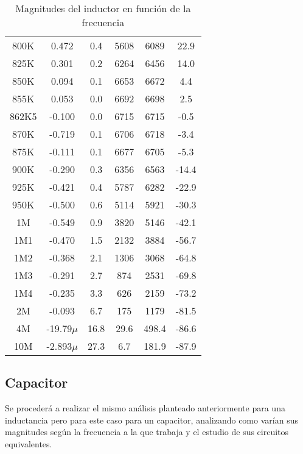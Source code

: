 \begin{center}
\begin{table}[H]
\begin{tabular}{ c c c c c c }
				800K  & 0.472       & 0.4 		 & 5608 	& 6089  & 22.9       \\
				825K  & 0.301       & 0.2  		& 6264 		& 6456  & 14.0       \\
				850K  & 0.094        & 0.1  	& 6653		& 6672  & 4.4        \\
				855K  & 0.053       & 0.0  		  & 6692	 & 6698  & 2.5        \\
				862K5 & -0.100         & 0.0    & 6715 		& 6715  & -0.5       \\
				870K  & -0.719       & 0.1 		 & 6706 	& 6718  & -3.4        \\
				875K  & -0.111      & 0.1  		& 6677 		& 6705  & -5.3       \\
				900K  & -0.290      & 0.3  		& 6356 		& 6563  & -14.4      \\
				925K  & -0.421      & 0.4 		 & 5787		 & 6282  & -22.9      \\
				950K  & -0.500         & 0.6  	& 5114 		& 5921  & -30.3       \\
				1M    & -0.549      & 0.9  		& 3820		 & 5146  & -42.1      \\
				1M1  & -0.470      & 1.5  		& 2132		 & 3884  & -56.7      \\
				1M2  & -0.368      & 2.1  		& 1306 		& 3068  & -64.8      \\
				1M3   & -0.291      & 2.7  		& 874  		& 2531  & -69.8      \\
				1M4  & -0.235      & 3.3 		 & 626  	& 2159  & -73.2     \\
				2M    & -0.093      & 6.7 		 & 175 		 & 1179  & -81.5       \\
				4M    & -19.79$\mu$  & 16.8 		& 29.6		 & 498.4 & -86.6     \\
				10M   & -2.893$\mu$ & 27.3 		& 6.7  		& 181.9 & -87.9     \\
            \hline 
        \end{tabular}
        \caption{Magnitudes del inductor en función de la frecuencia}
        \label{table:Rta_en_frecuencia_inductor}
    \end{table}
\end{center}
\subsection*{Capacitor}
Se procederá a realizar el mismo análisis planteado anteriormente para una inductancia pero para este caso para un capacitor, analizando como varían sus magnitudes según la frecuencia a la que trabaja y el estudio de sus circuitos equivalentes.

